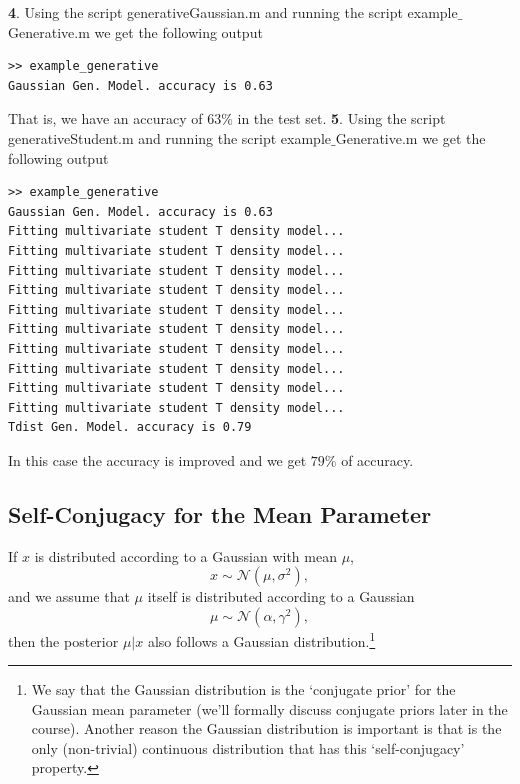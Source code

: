 \documentclass{article}
\begin{document}
\textbf{4}.
\newline
Using the script generativeGaussian.m and running the script example$\_$Generative.m we get the following output
\begin{verbatim}
>> example_generative
Gaussian Gen. Model. accuracy is 0.63
\end{verbatim}
That is, we have an accuracy of $63\%$ in the test set.
\newline
\textbf{5}.
\newline
Using the script generativeStudent.m and running the script example$\_$Generative.m we get the following output
\begin{verbatim}
>> example_generative
Gaussian Gen. Model. accuracy is 0.63
Fitting multivariate student T density model...
Fitting multivariate student T density model...
Fitting multivariate student T density model...
Fitting multivariate student T density model...
Fitting multivariate student T density model...
Fitting multivariate student T density model...
Fitting multivariate student T density model...
Fitting multivariate student T density model...
Fitting multivariate student T density model...
Fitting multivariate student T density model...
Tdist Gen. Model. accuracy is 0.79
\end{verbatim}
In this case the accuracy is improved and we get $79\%$ of accuracy.


\newpage
\subsection{Self-Conjugacy for the Mean Parameter}

If $x$ is distributed according to a Gaussian with mean $\mu$,
\[
x \sim \mathcal{N}(\mu,\sigma^2),
\]
and we assume that $\mu$ itself is distributed according to a Gaussian
\[
\mu \sim \mathcal{N}(\alpha,\gamma^2),
\]
then the posterior $\mu | x$ also follows a Gaussian distribution.\footnote{We say that the Gaussian distribution is the `conjugate prior' for the Gaussian mean parameter (we'll formally discuss conjugate priors later in the course). Another reason the Gaussian distribution is important is that is the only (non-trivial) continuous distribution that has this `self-conjugacy' property.}  %
\end{document}
